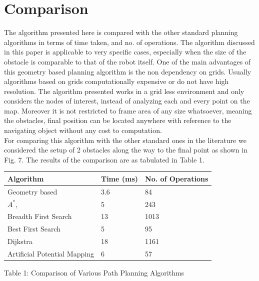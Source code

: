 \documentclass[letterpaper, 10 pt, conference]{ieeeconf}  %
\begin{document}
\section{Comparison}
The algorithm presented here is compared with the other standard planning algorithms in terms of time taken, and no. of operations. The algorithm discussed in this paper is applicable to very specific cases, especially when the size of the obstacle is comparable to that of the robot itself. One of the main advantages of this geometry based planning algorithm is the non dependency on grids. Usually algorithms based on grids computationally expensive or do not have high resolution. The algorithm presented works in a grid less environment and only considers the nodes of interest, instead of analyzing each and every point on the map. Moreover it is not restricted to frame area of any size whatsoever, meaning the obstacles, final position can be located anywhere with reference to the navigating object without any cost to computation.\\
For comparing this algorithm with the other standard ones in the literature we considered the setup of 2 obstacles along the way to the final point as shown in Fig. 7. The results of the comparison are as tabulated in Table 1.\\ 
\begin{center}
    \begin{tabular}{| p{3cm} | l | p{2.5cm} |}
    \hline
    \textbf{Algorithm} & \textbf{Time (ms)} & \textbf{No. of Operations} \\ \hline
    Geometry based & 3.6 & 84  \\ \hline
    $A^{*}$,  & 5 & 243  \\ \hline
    Breadth First Search & 13  & 1013 \\
    \hline
    Best First Search & 5  & 95 \\ \hline
    Dijkstra & 18  & 1161 \\ \hline
    Artificial Potential Mapping & 6 & 57\\ \hline
    \end{tabular}
\end{center}
\begin{center}
\small{Table 1: Comparison of Various Path Planning Algorithms\\}
\end{center}
\end{document}
